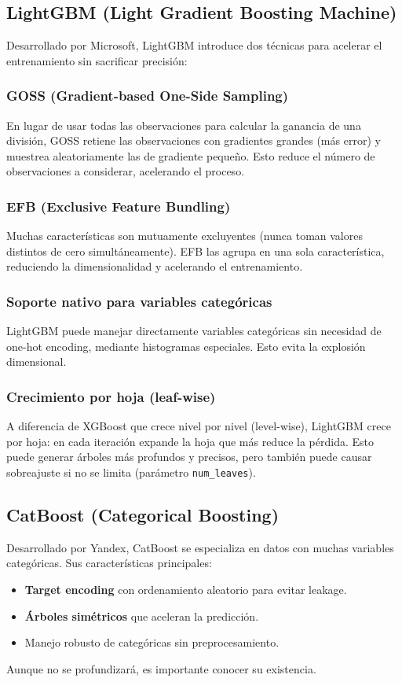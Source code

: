 \documentclass[12pt,a4paper,openany,oneside]{book}
\begin{document}
\subsection{LightGBM (Light Gradient Boosting Machine)}
Desarrollado por Microsoft, LightGBM introduce dos técnicas para acelerar el entrenamiento sin sacrificar precisión:

\subsubsection{GOSS (Gradient-based One-Side Sampling)}
En lugar de usar todas las observaciones para calcular la ganancia de una división, GOSS retiene las observaciones con gradientes grandes (más error) y muestrea aleatoriamente las de gradiente pequeño. Esto reduce el número de observaciones a considerar, acelerando el proceso.

\subsubsection{EFB (Exclusive Feature Bundling)}
Muchas características son mutuamente excluyentes (nunca toman valores distintos de cero simultáneamente). EFB las agrupa en una sola característica, reduciendo la dimensionalidad y acelerando el entrenamiento.

\subsubsection{Soporte nativo para variables categóricas}
LightGBM puede manejar directamente variables categóricas sin necesidad de one-hot encoding, mediante histogramas especiales. Esto evita la explosión dimensional.

\subsubsection{Crecimiento por hoja (leaf-wise)}
A diferencia de XGBoost que crece nivel por nivel (level-wise), LightGBM crece por hoja: en cada iteración expande la hoja que más reduce la pérdida. Esto puede generar árboles más profundos y precisos, pero también puede causar sobreajuste si no se limita (parámetro \texttt{num\_leaves}).

\subsection{CatBoost (Categorical Boosting)}
Desarrollado por Yandex, CatBoost se especializa en datos con muchas variables categóricas. Sus características principales:
\begin{itemize}
    \item \textbf{Target encoding} con ordenamiento aleatorio para evitar leakage.
    \item \textbf{Árboles simétricos} que aceleran la predicción.
    \item Manejo robusto de categóricas sin preprocesamiento.
\end{itemize}
Aunque no se profundizará, es importante conocer su existencia.
\end{document}
